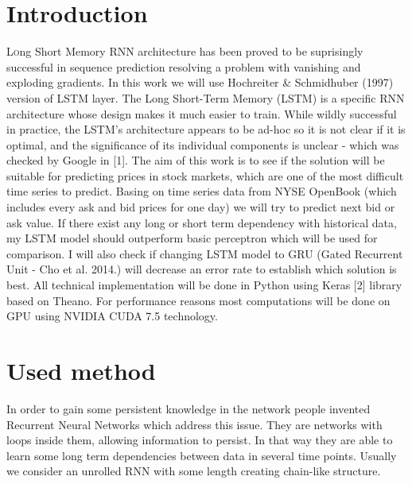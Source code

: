 \documentclass[twoside]{article}
\begin{document}
\begin{multicols}{2} %

\section{Introduction}

\lettrine[nindent=0em,lines=3]{L} ong Short Memory RNN architecture has been proved to be suprisingly successful in sequence prediction
resolving a problem with vanishing and exploding gradients. In this work we will use Hochreiter \& Schmidhuber (1997) version of LSTM layer. 
The Long Short-Term Memory (LSTM) is a specific RNN architecture whose design makes it much easier to train. While wildly successful in practice, the LSTM's architecture appears to be ad-hoc so it is not clear if it is optimal, and the significance of its individual components is unclear - which was checked by Google in [1]. The aim of this work is to see if the solution will be suitable for predicting prices in stock markets, which are one of the most difficult time series to predict.
Basing on time series data from NYSE OpenBook (which includes every ask and bid prices for one day)
we will try to predict next bid or ask value. If there exist any long or short term dependency with historical data, my LSTM model should outperform
basic perceptron which will be used for comparison. I will also check if changing LSTM model to GRU (Gated Recurrent Unit - Cho et al. 2014.) will
decrease an error rate to establish which solution is best.
All technical implementation will be done in Python using Keras [2] library based on Theano. For performance reasons most computations will be done on GPU using NVIDIA CUDA 7.5 technology. 



\section{Used method}

In order to gain some persistent knowledge in the network people invented Recurrent Neural Networks which address this issue.
They are networks with loops inside them, allowing information to persist. In that way they are able to learn some long term dependencies between
data in several time points. Usually we consider an unrolled RNN with some length creating chain-like structure.


\end{multicols}
\end{document}
